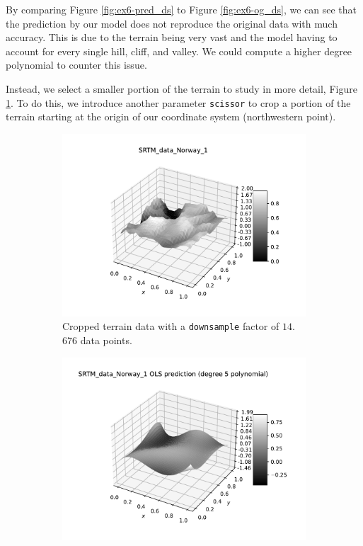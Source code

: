 \documentclass[10pt, a4paper]{article}
\begin{document}
    By comparing Figure \ref{fig:ex6-pred_ds} to Figure \ref{fig:ex6-og_ds}, we can see that the prediction by our model does not reproduce the original data with much accuracy. This is due to the terrain being very vast and the model having to account for every single hill, cliff, and valley. We could compute a higher degree polynomial to counter this issue.
    
    Instead, we select a smaller portion of the terrain to study in more detail, Figure \ref{fig:ex6-og}. To do this, we introduce another parameter \texttt{scissor} to crop a portion of the terrain starting at the origin of our coordinate system (northwestern point).
    
    \begin{figure}[h]
        \centering
        \begin{subfigure}{.49\textwidth}
            \centering
            \includegraphics[scale=0.45]{ex6_original_data.pdf}
            \caption{Cropped terrain data with a \texttt{downsample} factor of $14$. $676$ data points.} 
            \label{fig:ex6-og}
        \end{subfigure}
        \begin{subfigure}{.49\textwidth}
            \centering
            \includegraphics[scale=0.45]{ex6_pred_OLS.pdf} 

\end{subfigure}
\end{figure}
\end{document}
